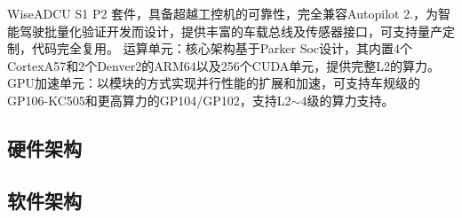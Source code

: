 \enskip{}\enskip{}\enskip{}\enskip{}Wise\+A\+D\+CU S1 P2 套件，具备超越工控机的可靠性，完全兼容\+Autopilot 2.，为智能驾驶批量化验证开发而设计，提供丰富的车载总线及传感器接口，可支持量产定制，代码完全复用。 运算单元：核心架构基于\+Parker Soc设计，其内置4个\+Cortex\+A57和2个\+Denver2的\+A\+R\+M64以及256个\+C\+U\+D\+A单元，提供完整\+L2的算力。 G\+P\+U加速单元：以模块的方式实现并行性能的扩展和加速，可支持车规级的\+G\+P106-\/\+K\+C505和更高算力的\+G\+P104/\+G\+P102，支持\+L2$\sim$4级的算力支持。

\subsection*{硬件架构}

\begin{center}\end{center} 

\subsection*{软件架构}

\begin{center}\end{center}  